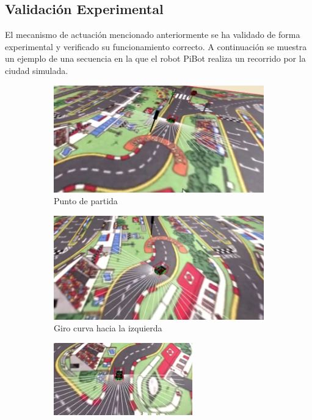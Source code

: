 \documentclass{report}
\begin{document}
\subsection{Validación Experimental}
El mecanismo de actuación mencionado anteriormente se ha validado de forma experimental y verificado su funcionamiento correcto. A continuación se muestra un ejemplo de una secuencia en la que el robot PiBot realiza un recorrido por la ciudad simulada.

\begin{figure}[h]
\begin{subfigure}{.5\textwidth}
  \centering
  \includegraphics[width=.7\linewidth]{images/cap4/1.png}  
  \caption{Punto de partida}
  \label{fig:sub-first}
\end{subfigure}
\begin{subfigure}{.5\textwidth}
  \centering
  \includegraphics[width=.7\linewidth]{images/cap4/2.png}  
  \caption{Giro curva hacia la izquierda}
  \label{fig:sub-second}
\end{subfigure}
\begin{subfigure}{.5\textwidth}
  \centering
  \includegraphics[width=.7\linewidth]{images/cap4/3.png}  

\end{subfigure}
\end{figure}
\end{document}
